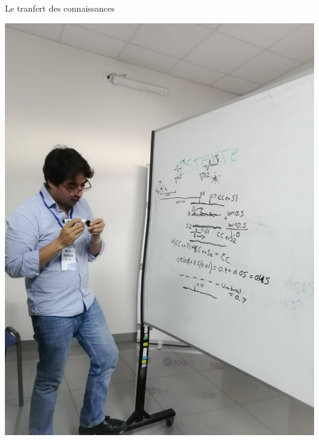 \documentclass{beamer}
\begin{document}
\begin{frame}
 {Le tranfert des connaissances}
 
 \begin{center}
  \begin{minipage}{0.3\linewidth}
   \includegraphics[width=1\linewidth]{images/Lima1}
  \end{minipage}
  \begin{minipage}{0.3\linewidth}

\end{minipage}
\end{center}
\end{frame}
\end{document}
